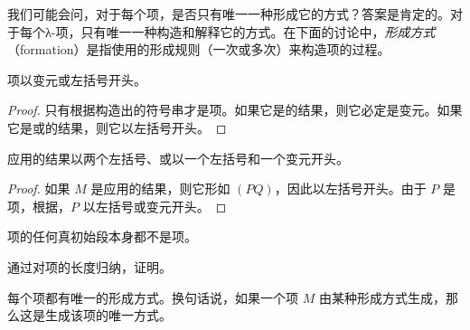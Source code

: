 \documentclass[../../../include/open-logic-section]{subfiles}
\begin{document}

我们可能会问，对于每个项，是否只有唯一一种形成它的方式？答案是肯定的。对于每个λ-项，只有唯一一种构造和解释它的方式。在下面的讨论中，\emph{形成方式}（formation）是指使用的形成规则（一次或多次）来构造项的过程。

\begin{lem}
项以变元或左括号开头。
\end{lem}

\begin{proof}
只有根据构造出的符号串才是项。如果它是的结果，则它必定是变元。如果它是或的结果，则它以左括号开头。
\end{proof}

\begin{lem}
应用的结果以两个左括号、或以一个左括号和一个变元开头。
\end{lem}

\begin{proof}
如果 $M$ 是应用的结果，则它形如 $(PQ)$，因此以左括号开头。由于 $P$ 是项，根据，$P$ 以左括号或变元开头。
\end{proof}

\begin{lem}
项的任何真初始段本身都不是项。
\end{lem}

\begin{prob}
通过对项的长度归纳，证明。
\end{prob}

\begin{prop}[唯一可读性] 
每个项都有唯一的形成方式。换句话说，如果一个项 $M$ 由某种形成方式生成，那么这是生成该项的唯一方式。
\end{prop}
\end{document}
